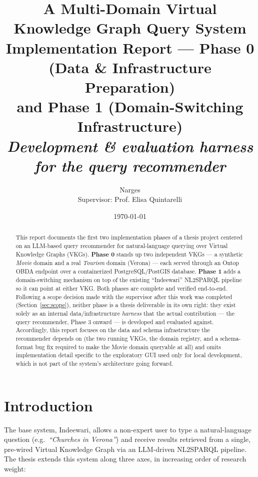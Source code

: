 \documentclass[11pt,a4paper]{article}
\title{\Large \textbf{A Multi-Domain Virtual Knowledge Graph Query System} \\[4pt]
\large Implementation Report --- Phase 0 (Data \& Infrastructure Preparation) \\
and Phase 1 (Domain-Switching Infrastructure) \\[2pt]
\normalsize \emph{Development \& evaluation harness for the query recommender}}
\author{Narges \\ \small Supervisor: Prof. Elisa Quintarelli}
\date{\today}
\begin{document}
\maketitle

\begin{abstract}
\noindent
This report documents the first two implementation phases of a thesis project centered on an
LLM-based query recommender for natural-language querying over Virtual Knowledge Graphs (VKGs).
\textbf{Phase 0} stands up two independent VKGs --- a synthetic \emph{Movie} domain and a real
\emph{Tourism} domain (Verona) --- each served through an Ontop OBDA endpoint over a
containerized PostgreSQL/PostGIS database. \textbf{Phase 1} adds a domain-switching mechanism on
top of the existing ``Indeewari'' NL2SPARQL pipeline so it can point at either VKG. Both phases
are complete and verified end-to-end. Following a scope decision made with the supervisor after
this work was completed (Section~\ref{sec:scope}), neither phase is a thesis deliverable in its
own right: they exist solely as an internal data/infrastructure \emph{harness} that the actual
contribution --- the query recommender, Phase 3 onward --- is developed and evaluated against.
Accordingly, this report focuses on the data and schema infrastructure the recommender depends on
(the two running VKGs, the domain registry, and a schema-format bug fix required to make the
Movie domain queryable at all) and omits implementation detail specific to the exploratory GUI
used only for local development, which is not part of the system's architecture going forward.
\end{abstract}

\tableofcontents
\newpage

\section{Introduction}

The base system, Indeewari, allows a non-expert user to type a natural-language question (e.g.\
\emph{``Churches in Verona''}) and receive results retrieved from a single, pre-wired Virtual
Knowledge Graph via an LLM-driven NL2SPARQL pipeline. The thesis extends this system along three
axes, in increasing order of research weight:
\end{document}
